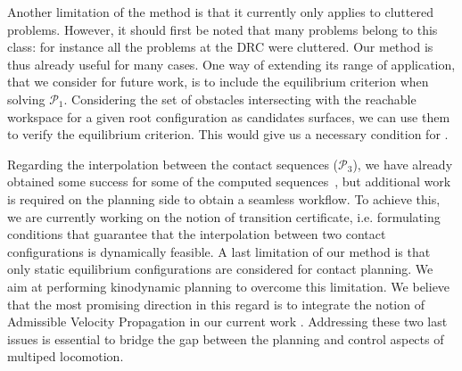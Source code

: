 Another limitation of the method is that it currently only applies to \gls{cluttered} problems.
However, it should first be noted that many problems belong to this class: for instance all the problems
at the DRC were \gls{cluttered}. Our method is thus already useful for many cases.
One way of extending its range of application, that we 
consider for future work, is to include the equilibrium criterion when solving $\mathcal{P}_1$.
Considering the set of obstacles intersecting with the reachable workspace for a given root configuration as candidates surfaces, we can use them to verify the equilibrium criterion.
This would give us a necessary condition for \equilibriumfeasibility.


Regarding the interpolation between the contact sequences ($\mathcal{P}_3$), we have already obtained some success for some of the computed sequences~\citep{Carpentier2016}, but additional
work is required on the planning side to obtain a seamless workflow. To achieve this, we are currently working on the notion of transition certificate, i.e. formulating
conditions that guarantee that the interpolation between two contact configurations is dynamically feasible.
A last limitation of our method is that only static equilibrium configurations are considered for contact planning.
We aim at performing kinodynamic planning to overcome this limitation. We believe that the most promising direction in this regard is to integrate
the notion of Admissible Velocity Propagation in our current work \citep{DBLP:conf/rss/PhamCN13}.
Addressing these two last issues is essential to bridge the gap between the planning and control aspects of multiped locomotion.
